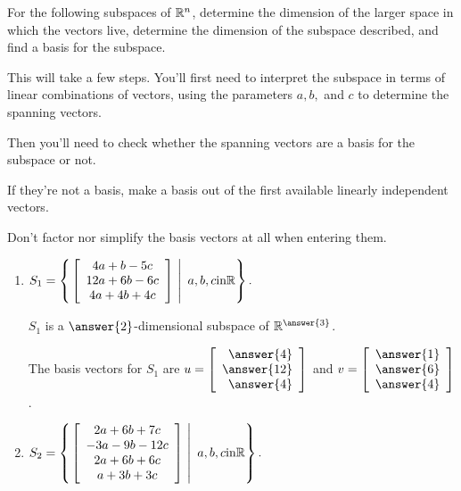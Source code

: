\documentclass{ximera}
\author{Zack Reed}
\begin{document}
\begin{exercise}

    For the following subspaces of
    $\R^n$, determine the dimension of the larger space in which the vectors live, determine the dimension of the subspace described, and find a basis for the subspace.

    \begin{hint}
    
        This will take a few steps. You'll first need to interpret the subspace in terms of linear combinations of vectors, using the parameters $a, b, $ and $c$ to determine the spanning vectors.

        Then you'll need to check whether the spanning vectors are a basis for the subspace or not. 

        If they're not a basis, make a basis out of the first available linearly independent vectors.

        Don't factor nor simplify the basis vectors at all when entering them.

    \end{hint}

    \begin{enumerate}

    \item $S_1 =
      \set{\left.\startmat{c}
            4a+b-5c \\
            12a+6b-6c \\
            4a+4b+4c
          \stopmat ~\right\vert~a,b,c\text{in} \R}.$

          $S_1$ is a $\answer{2}$-dimensional subspace of $\R^{\answer{3}}$.

          \begin{problem}

            The basis vectors for $S_1$ are $u=\startmat{r} \answer{4} \\ \answer{12} \\ \answer{4} \stopmat$ and $v=\startmat{r} \answer{1} \\ \answer{6} \\ \answer{4} \stopmat$.

          \end{problem}

          \item $S_2 =
          \set{\left.\startmat{c}
                2a+6b+7c \\
                -3a-9b-12c \\
                2a+6b+6c \\
                a+3b+3c
              \stopmat ~\right\vert~a,b,c\text{in} \R}.$
    

\end{enumerate}
\end{exercise}
\end{document}

